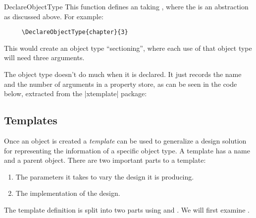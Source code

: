 \begin{docCommand} {DeclareObjectType} {  }
This function defines an  taking , where the  is an abstraction as discussed above. For example:
   \begin{verbatim}
     \DeclareObjectType{chapter}{3}
   \end{verbatim}
This would create an object type \enquote{sectioning}, where each use of that object type will need three arguments.   
\end{docCommand}

The object type doesn’t do much when it is declared. It just records the name and the number of arguments in a property store, as can be seen in the code below, extracted from the |xtemplate| package:


    
\subsection{Templates}

Once an object is created a \emph{template} can be used to generalize a design solution for representing the information of a specific object type. A template has a name and a parent object. There are two important parts to a template:

\begin{enumerate}
\item The parameters it takes to vary the design it is producing.
\item The implementation of the design.
\end{enumerate}

The template definition is split into two parts using  and .
We will first examine .

